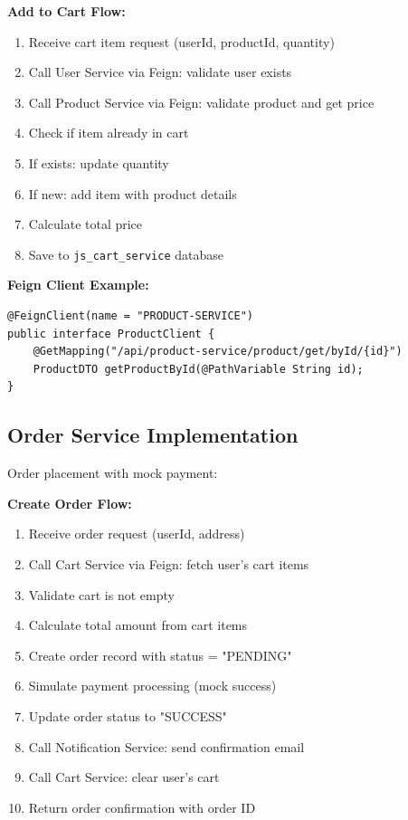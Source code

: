 \textbf{Add to Cart Flow:}
\begin{enumerate}
    \item Receive cart item request (userId, productId, quantity)
    \item Call User Service via Feign: validate user exists
    \item Call Product Service via Feign: validate product and get price
    \item Check if item already in cart
    \item If exists: update quantity
    \item If new: add item with product details
    \item Calculate total price
    \item Save to \texttt{js\_cart\_service} database
\end{enumerate}

\textbf{Feign Client Example:}
\begin{verbatim}
@FeignClient(name = "PRODUCT-SERVICE")
public interface ProductClient {
    @GetMapping("/api/product-service/product/get/byId/{id}")
    ProductDTO getProductById(@PathVariable String id);
}
\end{verbatim}

\subsection{Order Service Implementation}

Order placement with mock payment:

\textbf{Create Order Flow:}
\begin{enumerate}
    \item Receive order request (userId, address)
    \item Call Cart Service via Feign: fetch user's cart items
    \item Validate cart is not empty
    \item Calculate total amount from cart items
    \item Create order record with status = "PENDING"
    \item Simulate payment processing (mock success)
    \item Update order status to "SUCCESS"
    \item Call Notification Service: send confirmation email
    \item Call Cart Service: clear user's cart
    \item Return order confirmation with order ID
\end{enumerate}

